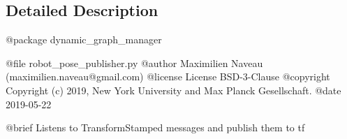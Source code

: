 \subsection{Detailed Description}
\begin{DoxyVerb}@package dynamic_graph_manager

@file robot_pose_publisher.py
@author Maximilien Naveau (maximilien.naveau@gmail.com)
@license License BSD-3-Clause
@copyright Copyright (c) 2019, New York University and Max Planck Gesellschaft.
@date 2019-05-22

@brief Listens to TransformStamped messages and publish them to tf\end{DoxyVerb}
 